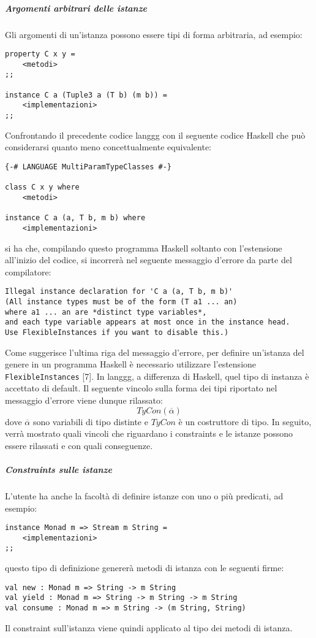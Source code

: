 \documentclass[10pt,a4paper]{article}
\begin{document}
\subparagraph{Argomenti arbitrari delle istanze}
Gli argomenti di un'istanza possono essere tipi di forma arbitraria, ad esempio:
\begin{lstlisting}
property C x y =
    <metodi>
;;

instance C a (Tuple3 a (T b) (m b)) =
    <implementazioni>
;;
\end{lstlisting}
Confrontando il precedente codice langgg con il seguente codice Haskell che può considerarsi quanto meno concettualmente
equivalente:
\begin{lstlisting}
{-# LANGUAGE MultiParamTypeClasses #-}

class C x y where
    <metodi>

instance C a (a, T b, m b) where
    <implementazioni>
\end{lstlisting}
si ha che, compilando questo programma Haskell soltanto con l'estensione all'inizio del codice, si incorrerà nel
seguente messaggio d'errore da parte del compilatore:
\begin{lstlisting}
Illegal instance declaration for 'C a (a, T b, m b)'
(All instance types must be of the form (T a1 ... an)
where a1 ... an are *distinct type variables*,
and each type variable appears at most once in the instance head.
Use FlexibleInstances if you want to disable this.)
\end{lstlisting}
Come suggerisce l'ultima riga del messaggio d'errore, per definire un'istanza del genere in un programma Haskell è
necessario utilizzare l'estensione \texttt{FlexibleInstances} [7]. In langgg, a differenza di Haskell, quel tipo di instanza
è accettato di default. Il seguente vincolo sulla forma dei tipi riportato nel messaggio d'errore viene dunque rilassato:
    \[ TyCon(\overline{\alpha}) \]
dove $ \overline{\alpha} $ sono variabili di tipo distinte e $ TyCon $ è un costruttore di tipo. In seguito, verrà
mostrato quali vincoli che riguardano i constraints e le istanze possono essere rilassati e con quali conseguenze.

\subparagraph{Constraints sulle istanze}
L'utente ha anche la facoltà di definire istanze con uno o più predicati, ad esempio:
\begin{lstlisting}
instance Monad m => Stream m String =
    <implementazioni>
;;
\end{lstlisting}
questo tipo di definizione genererà metodi di istanza con le seguenti firme:
\begin{lstlisting}
val new : Monad m => String -> m String
val yield : Monad m => String -> m String -> m String
val consume : Monad m => m String -> (m String, String)
\end{lstlisting}
Il constraint sull'istanza viene quindi applicato al tipo dei metodi di istanza.
\end{document}
